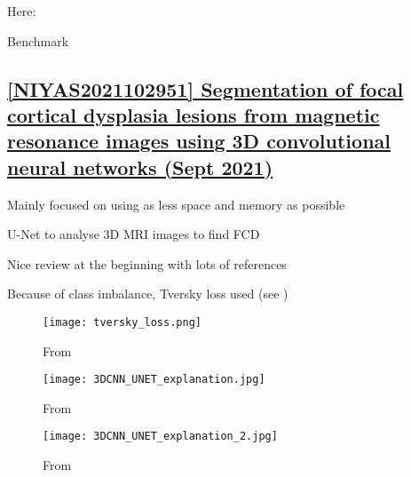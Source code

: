 Here: 

\begin{table}[htbp]
	\centering
	\caption{Benchmark}

	\caption{Results from }
	\label{tab:res8}
\end{table}

\newpage
\subsection{\href{https://www.sciencedirect.com/science/article/pii/S1746809421005486}{[NIYAS2021102951] Segmentation of focal cortical dysplasia lesions from magnetic resonance images using 3D convolutional neural networks (Sept 2021) }}
\label{res9}

Mainly focused on using as less space and memory as possible

U-Net to analyse 3D MRI images to find FCD

Nice review at the beginning with lots of references

Because of class imbalance, Tversky loss used (see )

\begin{figure}[htbp]
	\centering
	\texttt{[image: tversky\_loss.png]}
	\caption{From }%
	\label{fig:res9_0}
\end{figure}

\begin{figure}[htbp]
	\centering
	\texttt{[image: 3DCNN\_UNET\_explanation.jpg]}
	\caption{From }%
	\label{fig:res9_1}
\end{figure}

\begin{figure}[htbp]
	\centering
	\texttt{[image: 3DCNN\_UNET\_explanation\_2.jpg]}
	\caption{From }%
	\label{fig:res9_2}
\end{figure}

